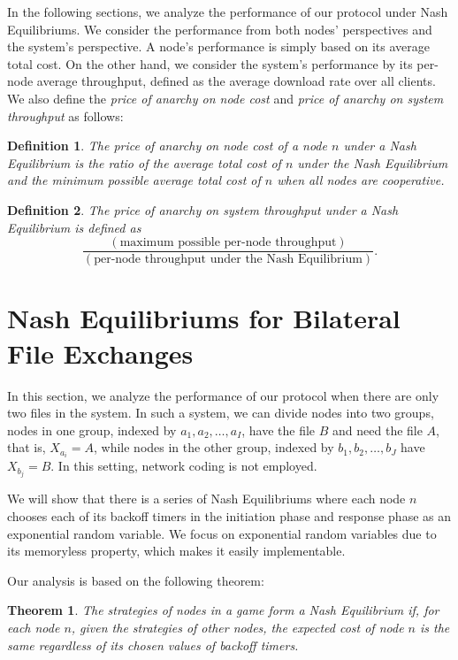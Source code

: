 \documentclass[11pt, conference]{IEEEtran}
\newtheorem{definition}{Definition}
\newtheorem{theorem}{Theorem}
\begin{document}
In the following sections, we analyze the performance of our protocol under Nash Equilibriums. We consider the performance from both nodes' perspectives and the system's perspective. A node's performance is simply based on its average total cost. On the other hand, we consider the system's performance by its per-node average throughput, defined as the average download rate over all clients. We also define the \emph{price of anarchy on node cost} and \emph{price of anarchy on system throughput} as follows:

\begin{definition}
The \emph{price of anarchy on node cost} of a node $n$ under a Nash Equilibrium is the ratio of the average total cost of $n$ under the Nash Equilibrium and the minimum possible average total cost of $n$ when all nodes are cooperative.
\end{definition}

\begin{definition}
The \emph{price of anarchy on system throughput} under a Nash Equilibrium is defined as $$\frac{(\mbox{maximum possible per-node throughput})}{(\mbox{per-node throughput under the Nash Equilibrium})}.$$
\end{definition}






\section{Nash Equilibriums for Bilateral File Exchanges}	\label{section:bilateral}

In this section, we analyze the performance of our protocol when there are only two files in the system. In such a system, we can divide nodes into two groups, nodes in one group, indexed by $a_1,a_2,\dots, a_I$, have the file $B$ and need the file $A$, that is, $X_{a_i}=A$, while nodes in the other group, indexed by $b_1, b_2,\dots, b_J$ have $X_{b_j}=B$. In this setting, network coding is not employed.

We will show that there is a series of Nash Equilibriums where each node $n$ chooses each of its backoff timers in the initiation phase and response phase as an exponential random variable. We focus on exponential random variables due to its memoryless property, which makes it easily implementable. 



Our analysis is based on the following theorem:

\begin{theorem}	\label{theorem:condition for NE} \cite[Lemma~3.1]{textbook}
The strategies of nodes in a game form a Nash Equilibrium if, for each node $n$, given the strategies of other nodes, the expected cost of node $n$ is the same regardless of its chosen values of backoff timers.
\end{theorem}
\end{document}
